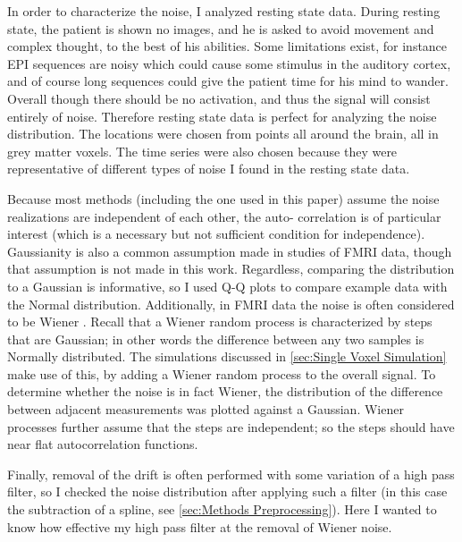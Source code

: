 In order to characterize the noise, I analyzed resting state data.
During resting state, the patient is shown no images, and he is asked
to avoid movement and complex thought, to the best of his abilities.
Some limitations exist, for instance EPI sequences are noisy
which could cause some stimulus in the auditory cortex, and of course
long sequences could give the patient time for his mind to wander.
Overall though there should be no activation, and thus the signal will
consist entirely of noise. Therefore resting state data is perfect
for analyzing the noise distribution. The locations were chosen from
points all around the brain, all in grey matter voxels. The time
series were also chosen because they were representative of different types
of noise I found in the resting state data.

Because most methods (including the one used in this paper)
assume the noise realizations are independent of each other, the auto-
correlation is of particular interest (which is a necessary but not
sufficient condition for independence). Gaussianity is also a common
assumption made in studies of FMRI data, though that assumption is not
made in this work. Regardless, comparing the distribution to a Gaussian
is informative, so I used Q-Q plots to compare example data with the
Normal distribution. Additionally, in FMRI data the noise is often considered 
to be Wiener \cite{Riera2003}. Recall that a Wiener random process is
characterized by steps that are Gaussian; in other words the difference between
any two samples is Normally distributed. The simulations discussed in 
\autoref{sec:Single Voxel Simulation} make use of this, 
by adding a Wiener random process to the overall signal. To determine
whether the noise is in fact Wiener, the distribution of 
the difference between adjacent measurements was plotted against
a Gaussian. Wiener processes further assume that the steps are independent;
so the steps should have near flat autocorrelation functions.

Finally, removal of the drift is often
performed with some variation of a high pass filter, 
so I checked the noise distribution after applying such a filter (in
this case the subtraction of a spline, see \autoref{sec:Methods Preprocessing}).
Here I wanted to know how effective my high pass filter at the removal of
Wiener noise.

